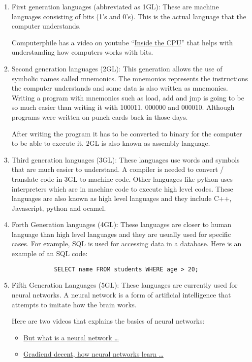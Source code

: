 \documentclass{book}
\begin{document}
\begin{enumerate}
	\item First generation languages (abbreviated as 1GL): These are machine languages consisting of bits (1's and 0's). This is the actual language that the computer understands.

		Computerphile has a video on youtube ``\href{https://www.youtube.com/watch?v=IAkj32VPcUE}{Inside the CPU}'' that helps with understanding how computers works with bits.
	\item Second generation languages (2GL): This generation allows the use of symbolic names called mnemonics. The mnemonics represents the instructions the computer understands and some data is also written as mnemonics. Writing a program with mnemonics such as load, add and jmp is going to be so much easier than writing it with 100011, 000000 and 000010. Although programs were written on punch cards back in those days.

		After writing the program it has to be converted to binary for the computer to be able to execute it. 2GL is also known as assembly language.
	\item Third generation languages (3GL): These languages use words and symbols that are much easier to understand.
		A compiler is needed to convert / translate code in 3GL to machine code.
		Other languages like python uses interpreters which are in machine code to execute high level codes.
		These languages are also known as high level languages and they include C++, Javascript, python and ocamel.
	\item Forth Generation languages (4GL): These languages are closer to human language than high level languages and they are usually used for specific cases. For example, SQL is used for accessing data in a database. Here is an example of an SQL code:

		\begin{verbatim}
			SELECT name FROM students WHERE age > 20;
		\end{verbatim}

	\item Fifth Generation Languages (5GL): These languages are currently used for neural networks. A neural network is a form of artificial intelligence that attempts to imitate how the brain works.

		Here are two videos that explains the basics of neural networks:

		\begin{itemize}
			\item \href{https://www.youtube.com/watch?v=aircAruvnKk}{But what is a neural network \ldots}
			\item \href{https://www.youtube.com/watch?v=IHZwWFHWa-w}{Gradiend decent, how neural networks learn \ldots}
		\end{itemize}
\end{enumerate}
\end{document}
